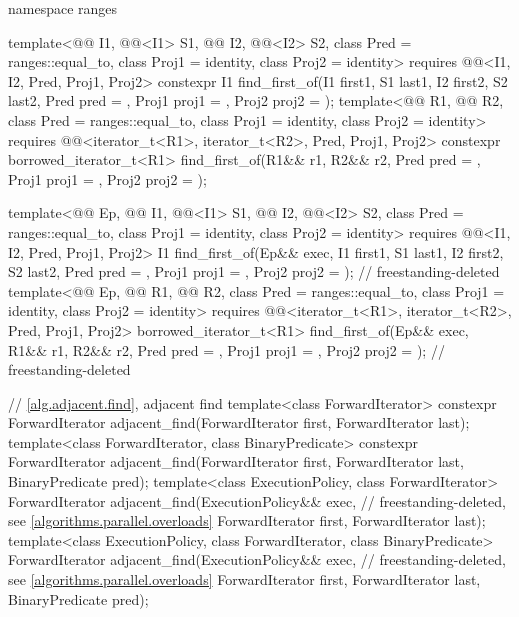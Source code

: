 \begin{codeblock}
{  namespace ranges {
    template<@@ I1, @@<I1> S1, @@ I2, @@<I2> S2,
             class Pred = ranges::equal_to, class Proj1 = identity, class Proj2 = identity>
      requires @@<I1, I2, Pred, Proj1, Proj2>
      constexpr I1 find_first_of(I1 first1, S1 last1, I2 first2, S2 last2, Pred pred = {},
                                 Proj1 proj1 = {}, Proj2 proj2 = {});
    template<@@ R1, @@ R2,
             class Pred = ranges::equal_to, class Proj1 = identity, class Proj2 = identity>
      requires @@<iterator_t<R1>, iterator_t<R2>, Pred, Proj1, Proj2>
      constexpr borrowed_iterator_t<R1>
        find_first_of(R1&& r1, R2&& r2, Pred pred = {},
                      Proj1 proj1 = {}, Proj2 proj2 = {});

    template<@@ Ep, @@ I1, @@<I1> S1,
             @@ I2, @@<I2> S2,
             class Pred = ranges::equal_to, class Proj1 = identity, class Proj2 = identity>
      requires @@<I1, I2, Pred, Proj1, Proj2>
      I1 find_first_of(Ep&& exec, I1 first1, S1 last1, I2 first2, S2 last2, Pred pred = {},
                       Proj1 proj1 = {}, Proj2 proj2 = {});     // freestanding-deleted
    template<@@ Ep, @@ R1, @@ R2,
             class Pred = ranges::equal_to, class Proj1 = identity, class Proj2 = identity>
      requires @@<iterator_t<R1>, iterator_t<R2>, Pred, Proj1, Proj2>
      borrowed_iterator_t<R1>
        find_first_of(Ep&& exec, R1&& r1, R2&& r2, Pred pred = {},
                      Proj1 proj1 = {}, Proj2 proj2 = {});      // freestanding-deleted
  }

  // \ref{alg.adjacent.find}, adjacent find
  template<class ForwardIterator>
    constexpr ForwardIterator
      adjacent_find(ForwardIterator first, ForwardIterator last);
  template<class ForwardIterator, class BinaryPredicate>
    constexpr ForwardIterator
      adjacent_find(ForwardIterator first, ForwardIterator last,
                    BinaryPredicate pred);
  template<class ExecutionPolicy, class ForwardIterator>
    ForwardIterator
      adjacent_find(ExecutionPolicy&& exec,                     // freestanding-deleted, see \ref{algorithms.parallel.overloads}
                    ForwardIterator first, ForwardIterator last);
  template<class ExecutionPolicy, class ForwardIterator, class BinaryPredicate>
    ForwardIterator
      adjacent_find(ExecutionPolicy&& exec,                     // freestanding-deleted, see \ref{algorithms.parallel.overloads}
                    ForwardIterator first, ForwardIterator last,
                    BinaryPredicate pred);

}
\end{codeblock}
